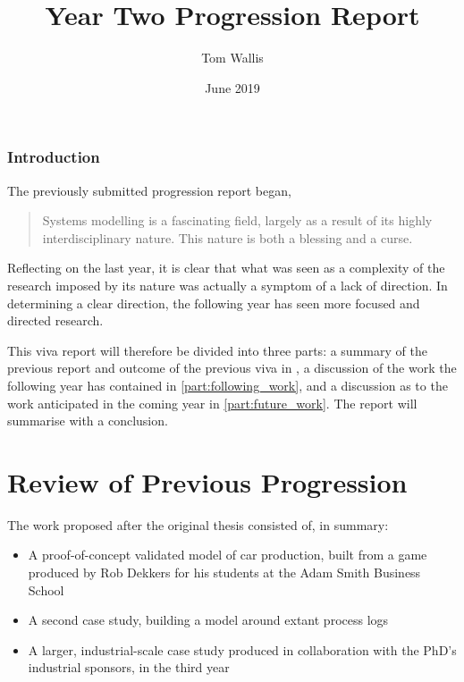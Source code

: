 \documentclass[11pt]{article}
\author{Tom Wallis}
\date{June 2019}
\title{Year Two Progression Report}
\begin{document}
\maketitle
\begin{abstract}
\end{abstract}


\section{Introduction}
\label{sec:org59a97d5}

The previously submitted progression report began,


\begin{quote}
Systems modelling is a fascinating field, largely as a result of its highly
interdisciplinary nature. This nature is both a blessing and a curse.
\end{quote}

Reflecting on the last year, it is clear that what was seen as a complexity of
the research imposed by its nature was actually a symptom of a lack of
direction. In determining a clear direction, the following year has seen more
focused and directed research.

This viva report will therefore be divided into three parts: a summary of the
previous report and outcome of the previous viva in
\cref{part:previous_viva_summary}, a discussion of the work the following year
has contained in \cref{part:following_work}, and a discussion as to the work
anticipated in the coming year in \cref{part:future_work}. The report will
summarise with a conclusion.


\part{Review of Previous Progression}
\label{part:previous_viva_summary}

The work proposed after the original thesis consisted of, in summary:  

\begin{itemize}
\item A proof-of-concept validated model of car production, built from a game
produced by Rob Dekkers for his students at the Adam Smith Business School
\item A second case study, building a model around extant process logs
\item A larger, industrial-scale case study produced in collaboration with the
PhD's industrial sponsors, in the third year
\end{itemize}
\end{document}
